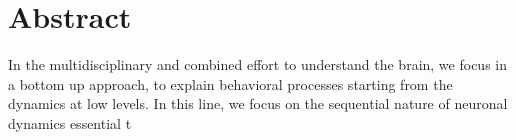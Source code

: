 \chapter*{Abstract}
In the multidisciplinary and combined effort to understand the brain, we focus in a bottom up approach, to explain behavioral processes starting from the dynamics at low levels. In this line, we focus on the sequential nature of neuronal dynamics essential t